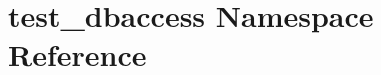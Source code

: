 \hypertarget{namespacetest__dbaccess}{\section{test\-\_\-dbaccess Namespace Reference}
\label{namespacetest__dbaccess}
}
